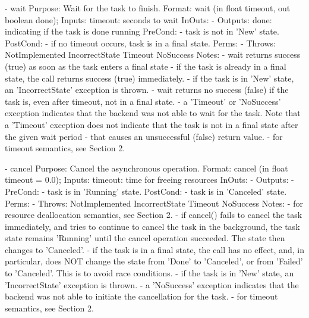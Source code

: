 \begin{myspec}
 
    - wait
      Purpose:  Wait for the task to finish.
      Format:   wait                 (in  float   timeout,
                                      out boolean done);
      Inputs:   timeout:              seconds to wait
      InOuts:   -
      Outputs:  done:                 indicating if the task
                                      is done running
      PreCond:  - task is not in 'New' state.
      PostCond: - if no timeout occurs, task is in a final 
                  state.
      Perms:    -
      Throws:   NotImplemented
                IncorrectState
                Timeout
                NoSuccess
      Notes:    - wait returns success (true) as soon as the
                  task enters a final state
                - if the task is already in a final state, the
                  call returns success (true) immediately.
                - if the task is in 'New' state, an
                  'IncorrectState' exception is thrown.
                - wait returns no success (false) if the task 
                  is, even after timeout, not in a final state.
                - a 'Timeout' or 'NoSuccess' exception indicates
                  that the backend was not able to wait for the
                  task.  Note that a 'Timeout' exception does
                  not indicate that the task is not in a final
                  state after the given wait period - that
                  causes an unsuccessful (false) return value.
                - for timeout semantics, see Section 2.
 
 
    - cancel
      Purpose:  Cancel the asynchronous operation.
      Format:   cancel               (in  float  timeout = 0.0);
      Inputs:   timeout:              time for freeing resources
      InOuts:   -
      Outputs:  -
      PreCond:  - task is in 'Running' state.
      PostCond: - task is in 'Canceled' state.
      Perms:    -
      Throws:   NotImplemented
                IncorrectState
                Timeout
                NoSuccess
      Notes:    - for resource deallocation semantics, see 
                  Section 2.
                - if cancel() fails to cancel the task
                  immediately, and tries to continue to cancel
                  the task in the background, the task state 
                  remains 'Running' until the cancel operation 
                  succeeded.  The state then changes to 
                  'Canceled'.
                - if the task is in a final state, the call has
                  no effect, and, in particular, does NOT change
                  the state from 'Done' to 'Canceled', or from 
                  'Failed' to 'Canceled'.  This is to
                  avoid race conditions.
                - if the task is in 'New' state, an
                  'IncorrectState' exception is thrown.
                - a 'NoSuccess' exception indicates
                  that the backend was not able to initiate the
                  cancellation for the task.
                - for timeout semantics, see Section 2.
 

\end{myspec}
